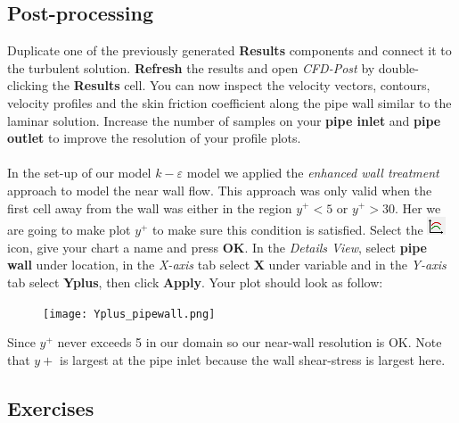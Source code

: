 \documentclass[11pt,a4paper,oneside]{scrartcl}
\newcommand\bfr[1]{\textcolor[rgb]{1,0.00,0.00}{\textbf{\textsf{#1}}}}
\begin{document}
\subsection{Post-processing}
Duplicate one of the previously generated \bfr{Results} components and connect it to the turbulent solution. \bfr{Refresh} the results and open \emph{CFD-Post} by double-clicking the \bfr{Results} cell. You can now inspect the velocity vectors, contours, velocity profiles and the skin friction coefficient along the pipe wall similar to the laminar solution. Increase the number of samples on your \bfr{pipe inlet} and \bfr{pipe outlet} to improve the resolution of your profile plots.
\\
\\
In the set-up of our model $k-\varepsilon$ model we applied the \emph{enhanced wall treatment} approach to model the near wall flow. This approach was only valid when the first cell away from the wall was either in the region $y^+<5$ or $y^+>30$. Her we are going to make plot $y^+$ to make sure this condition is satisfied. Select the \includegraphics[width=.4cm]{chart_icon.png} icon, give your chart a name and press \bfr{OK}. In the \emph{Details View}, select \bfr{pipe wall} under location, in the \emph{X-axis} tab select \bfr{X} under variable and in the \emph{Y-axis} tab select \bfr{Yplus}, then click \bfr{Apply}. Your plot should look as follow:

\begin{figure}[H]
\begin{center}
\texttt{[image: Yplus\_pipewall.png]}
\end{center}
\end{figure}

Since $y^+$ never exceeds 5 in our domain so our near-wall resolution is OK. Note that $y+$ is largest at the pipe inlet because the wall shear-stress is largest here.

\subsection{Exercises}
\end{document}
